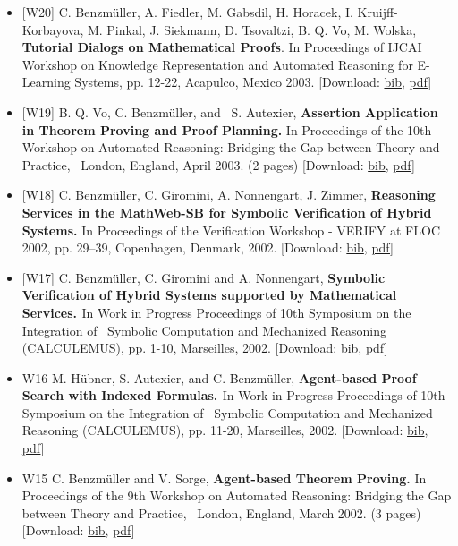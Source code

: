\documentclass{article}
\newcommand{\tmtextbf}[1]{{\bfseries{#1}}}
\newenvironment{itemizedot}{\begin{itemize} \renewcommand{\labelitemi}{$\bullet$}\renewcommand{\labelitemii}{$\bullet$}\renewcommand{\labelitemiii}{$\bullet$}\renewcommand{\labelitemiv}{$\bullet$}}{\end{itemize}}
\begin{document}
\begin{itemizedot}
  \item {\small [W20] C. Benzm\"uller, A. Fiedler, M. Gabsdil, H. Horacek, I.
  Kruijff-Korbayova, M. Pinkal, J. Siekmann, D. Tsovaltzi, B. Q. Vo, M.
  Wolska, \tmtextbf{Tutorial Dialogs on Mathematical Proofs}.} {\small In
  Proceedings of IJCAI Workshop on Knowledge Representation and Automated
  Reasoning for E-Learning Systems, pp. 12-22, Acapulco, Mexico 2003.}
  {\color{grey} [Download: {\small \href{../papers/W20.bib}{bib},
  \href{../papers/W20.pdf}{pdf}}]}
  
  \item {\small [W19] B. Q. Vo, C. Benzm\"uller, and \ S. Autexier,
  \tmtextbf{Assertion Application in Theorem Proving and Proof Planning.}}
  {\small In Proceedings of the 10th Workshop on Automated Reasoning: Bridging
  the Gap between Theory and Practice, \ London, England, April 2003. (2
  pages)} {\color{grey} [Download: {\small \href{../papers/W19.bib}{bib},
  \href{../papers/W19.pdf}{pdf}}]}
  
  \item {\small [W18] C. Benzm\"uller, C. Giromini, A. Nonnengart, J. Zimmer,
  \tmtextbf{Reasoning Services in the MathWeb-SB for Symbolic Verification of
  Hybrid Systems.}} {\small In Proceedings of the Verification Workshop -
  VERIFY at FLOC 2002, pp. 29--39, Copenhagen, Denmark, 2002.} {\color{grey}
  [Download: {\small \href{../papers/W18.bib}{bib},
  \href{../papers/W18.pdf}{pdf}}]}
  
  \item {\small [W17] C. Benzm\"uller, C. Giromini and A. Nonnengart,
  \tmtextbf{Symbolic Verification of Hybrid Systems supported by Mathematical
  Services. }In Work in Progress Proceedings of 10th Symposium on the
  Integration of \ Symbolic Computation and Mechanized Reasoning (CALCULEMUS),
  pp. 1-10, Marseilles, 2002.} {\color{grey} [Download: {\small
  \href{../papers/W17.bib}{bib}, \href{../papers/W17.pdf}{pdf}}]}
  
  \item [W16] {\small M. H\"ubner, S. Autexier, and C. Benzm\"uller,
  \tmtextbf{Agent-based Proof Search with Indexed Formulas. }In Work in
  Progress Proceedings of 10th Symposium on the Integration of \ Symbolic
  Computation and Mechanized Reasoning (CALCULEMUS), pp. 11-20, Marseilles,
  2002.} {\color{grey} [Download: {\small \href{../papers/W16.bib}{bib},
  \href{../papers/W16.pdf}{pdf}}]}
  
  \item [W15] {\small C. Benzm\"uller and V. Sorge, \tmtextbf{Agent-based
  Theorem Proving.}} {\small In Proceedings of the 9th Workshop on Automated
  Reasoning: Bridging the Gap between Theory and Practice, \ London, England,
  March 2002. (3 pages)} {\color{grey} [Download: {\small
  \href{../papers/W15.bib}{bib}, \href{../papers/W15.pdf}{pdf}}]}
  

\end{itemizedot}
\end{document}
